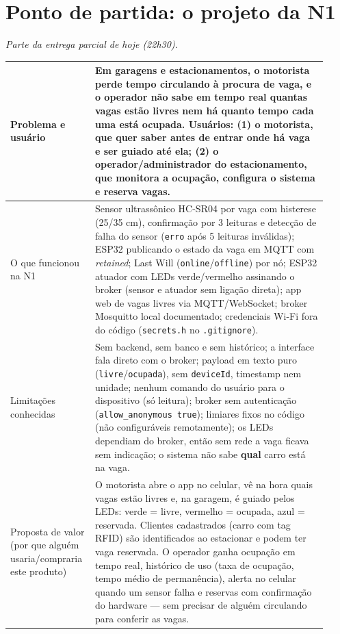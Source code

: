 \documentclass[11pt,a4paper]{article}
\newcommand{\parcial}{\textit{\small Parte da entrega parcial de hoje (22h30).}\par\medskip}
\newcommand{\cod}[1]{\texttt{#1}}
\begin{document}
\section{Ponto de partida: o projeto da N1}
\parcial

\begin{longtable}{|p{0.22\linewidth}|p{0.70\linewidth}|}
\hline
Problema e usuário & Em garagens e estacionamentos, o motorista perde tempo circulando à procura de vaga, e o operador não sabe em tempo real quantas vagas estão livres nem há quanto tempo cada uma está ocupada. \textbf{Usuários:} (1) o \textbf{motorista}, que quer saber antes de entrar onde há vaga e ser guiado até ela; (2) o \textbf{operador/administrador} do estacionamento, que monitora a ocupação, configura o sistema e reserva vagas. \\ \hline
O que funcionou na N1 & Sensor ultrassônico HC-SR04 por vaga com histerese (25/35 cm), confirmação por 3 leituras e detecção de falha do sensor (\cod{erro} após 5 leituras inválidas); ESP32 publicando o estado da vaga em MQTT com \textit{retained}; Last Will (\cod{online}/\cod{offline}) por nó; ESP32 atuador com LEDs verde/vermelho assinando o broker (sensor e atuador sem ligação direta); app web de vagas livres via MQTT/WebSocket; broker Mosquitto local documentado; credenciais Wi-Fi fora do código (\cod{secrets.h} no \cod{.gitignore}). \\ \hline
Limitações conhecidas & Sem backend, sem banco e sem histórico; a interface fala direto com o broker; payload em texto puro (\cod{livre}/\cod{ocupada}), sem \cod{deviceId}, timestamp nem unidade; nenhum comando do usuário para o dispositivo (só leitura); broker sem autenticação (\cod{allow\_anonymous true}); limiares fixos no código (não configuráveis remotamente); os LEDs dependiam do broker, então sem rede a vaga ficava sem indicação; o sistema não sabe \textbf{qual} carro está na vaga. \\ \hline
Proposta de valor (por que alguém usaria/compraria este produto) & O motorista abre o app no celular, vê na hora quais vagas estão livres e, na garagem, é guiado pelos LEDs: verde = livre, vermelho = ocupada, azul = reservada. Clientes cadastrados (carro com tag RFID) são identificados ao estacionar e podem ter vaga reservada. O operador ganha ocupação em tempo real, histórico de uso (taxa de ocupação, tempo médio de permanência), alerta no celular quando um sensor falha e reservas com confirmação do hardware --- sem precisar de alguém circulando para conferir as vagas. \\ \hline
\end{longtable}
\end{document}
